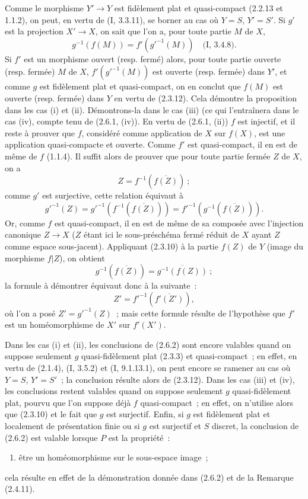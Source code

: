 Comme le morphisme $Y'\to Y$ est fidèlement plat et quasi-compact (2.2.13 et
1.1.2), on peut, en vertu de (I, 3.3.11), se borner au cas où $Y=S$,
$Y'=S'$. Si $g'$ est la projection $X'\to X$, on sait que l'on a, pour toute
partie $M$ de $X$,
\[
g^{-1}(f(M))=f'(g'^{-1}(M))\quad\text{(I, 3.4.8).}
\]
Si $f'$ est un morphisme ouvert (resp. fermé) alors, pour toute partie
ouverte (resp. fermée) $M$ de $X$, $f'(g'^{-1}(M))$ est ouverte (resp.
fermée) dans $Y'$, et comme $g$ est fidèlement plat et quasi-compact, on en
conclut que $f(M)$ est ouverte (resp. fermée) dans $Y$ en vertu de (2.3.12).
Cela démontre la proposition dans les cas (i) et (ii). Démontrons-la dans le
cas (iii) (ce qui l'entraînera dans le cas (iv), compte tenu de (2.6.1,
(iv)). En vertu de (2.6.1, (ii)) $f$ est injectif, et il reste à prouver que
$f$, considéré comme application de $X$ sur $f(X)$, est une application
quasi-compacte et ouverte. Comme $f'$ est quasi-compact, il en est de même de
$f$ (1.1.4). Il suffit alors de prouver que pour toute partie fermée $Z$ de
$X$, on a
\[
Z=f^{-1}(\overline{f(Z)})~;
\]
comme $g'$ est surjective, cette relation équivaut à
\[
g'^{-1}(Z)=g'^{-1}(f^{-1}(\overline{f(Z)}))
=f'^{-1}(g^{-1}(\overline{f(Z)})).
\]
Or, comme $f$ est quasi-compact, il en est de même de sa composée avec
l'injection canonique $Z\to X$ ($Z$ étant ici le sous-préschéma fermé réduit
de $X$ ayant $Z$ comme espace sous-jacent). Appliquant (2.3.10) à la partie
$f(Z)$ de $Y$ (image du morphisme $f|Z$), on obtient
\[
g^{-1}(\overline{f(Z)})=\overline{g^{-1}(f(Z))}~;
\]
la formule à démontrer équivaut donc à la suivante~:
\[
Z'=f'^{-1}(\overline{f'(Z')}),
\]
où l'on a posé $Z'=g'^{-1}(Z)$~; mais cette formule résulte de l'hypothèse
que $f'$ est un homéomorphisme de $X'$ sur $f'(X')$.

\begin{remark}[2.6.3]
\label{IV.2.6.3-fr}
Dans les cas (i) et (ii), les conclusions de (2.6.2) sont encore valables
quand on suppose seulement $g$ quasi-fidèlement plat (2.3.3) et
quasi-compact~; en effet, en vertu de (2.1.4), (I, 3.5.2) et
(I, 9.1.13.1), on peut encore se ramener au cas où $Y=S$, $Y'=S'$~; la
conclusion résulte alors de (2.3.12). Dans les cas (iii) et (iv), les
conclusions restent valables quand on suppose seulement $g$ quasi-fidèlement
plat, pourvu que l'on suppose déjà $f$ quasi-compact~; en effet, on n'utilise
alors que (2.3.10) et le fait que $g$ est surjectif. Enfin, si $g$ est
fidèlement plat et localement de présentation finie ou si $g$ est surjectif
et $S$ discret, la conclusion de (2.6.2) est valable lorsque $P$ est la
propriété~:
\begin{enumerate}
\item[(iii \emph{bis})] être un homéomorphisme sur le sous-espace image~;
\end{enumerate}
cela résulte en effet de la démonstration donnée dans (2.6.2) et de la
Remarque (2.4.11).
\end{remark}

